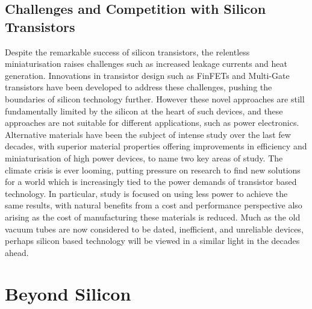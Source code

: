 \begin{refsection}

\subsection{Challenges and Competition with Silicon Transistors} 
Despite the remarkable success of silicon transistors, the relentless miniaturisation raises challenges such as increased leakage currents and heat generation. Innovations in transistor design such as FinFETs and Multi-Gate transistors have been developed to address these challenges, pushing the boundaries of silicon technology further. However these novel approaches are still fundamentally limited by the silicon at the heart of such devices, and these approaches are not suitable for different applications, such as power electronics. Alternative materials have been the subject of intense study over the last few decades, with superior material properties offering improvements in efficiency and miniaturisation of high power devices, to name two key areas of study. The climate crisis is ever looming, putting pressure on research to find new solutions for a world which is increasingly tied to the power demands of transistor based technology. In particular, study is focused on using less power to achieve the same results, with natural benefits from a cost and performance perspective also arising as the cost of manufacturing these materials is reduced. Much as the old vacuum tubes are now considered to be dated, inefficient, and unreliable devices, perhaps silicon based technology will be viewed in a similar light in the decades ahead.

\section{Beyond Silicon}

\end{refsection}

